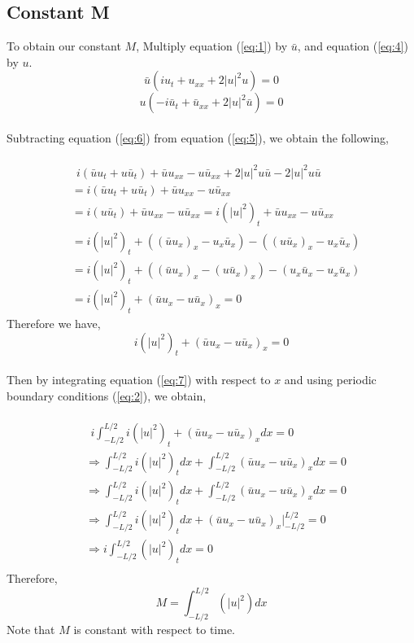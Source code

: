 \documentclass[11pt, oneside]{article}   	%
\begin{document}
\subsection{Constant M}
To obtain our constant $M$, Multiply equation (\ref{eq:1}) by $\bar{u}$, and equation (\ref{eq:4}) by $u$.\\
\begin{equation} \label{eq:5}
\bar{u}(iu_t + u_{xx} + 2|u|^2u) = 0
\end{equation}
\begin{equation} \label{eq:6}
u(-i\bar{u}_t + \bar{u}_{xx} + 2|u|^2\bar{u}) = 0
\end{equation}\\
Subtracting equation (\ref{eq:6}) from equation (\ref{eq:5}), we obtain the following,\\\\ 
\begin{align*}
&\ \ i(\bar{u}u_t + u\bar{u}_t) + \bar{u}u_{xx} - u\bar{u}_{xx} + 2|u|^2u\bar{u} - 2|u|^2u\bar{u} \\ 
&= i(\bar{u}u_t + u\bar{u}_t) + \bar{u}u_{xx} - u\bar{u}_{xx}\\
&= i(u\bar{u}_t) + \bar{u}u_{xx} - u\bar{u}_{xx} = i(|u|^2)_t + \bar{u}u_{xx} - u\bar{u}_{xx}\\
&= i(|u|^2)_t + ((\bar{u}u_x)_x - u_{x}\bar{u}_x) - ((u\bar{u}_x)_x - u_x\bar{u}_x)\\
&= i(|u|^2)_t + ((\bar{u}u_x)_x - (u\bar{u}_x)_x) - (u_{x}\bar{u}_x - u_x\bar{u}_x)\\
&= i(|u|^2)_t + (\bar{u}u_x - u\bar{u}_x)_x = 0
\end{align*}
Therefore we have,\\
\begin{equation} \label{eq:7}
i(|u|^2)_t + (\bar{u}u_x - u\bar{u}_x)_x = 0
\end{equation}\\
Then by integrating equation (\ref{eq:7}) with respect to $x$ and using periodic boundary conditions (\ref{eq:2}), we obtain,\\\\
\begin{align*}
&\ \ i\int_{-L/2}^{L/2} i(|u|^2)_t + (\bar{u}u_x - u\bar{u}_x)_x dx = 0\\
&\Rightarrow \int_{-L/2}^{L/2} i(|u|^2)_t dx + \int_{-L/2}^{L/2} (\bar{u}u_x - u\bar{u}_x)_x dx = 0\\
&\Rightarrow \int_{-L/2}^{L/2} i(|u|^2)_t dx + \int_{-L/2}^{L/2} (\bar{u}u_x - u\bar{u}_x)_x dx = 0\\
&\Rightarrow \int_{-L/2}^{L/2} i(|u|^2)_t dx + (\bar{u}u_x - u\bar{u}_x)_x\Big|_{-L/2}^{L/2}  = 0\\
&\Rightarrow i\int_{-L/2}^{L/2} (|u|^2)_t dx = 0\\ %
\end{align*}
Therefore, \\ 
\begin{equation} \label{eq:8}
    M = \int_{-L/2}^{L/2} (|u|^2) dx 
\end{equation}
Note that $M$ is constant with respect to time. 
\end{document}
